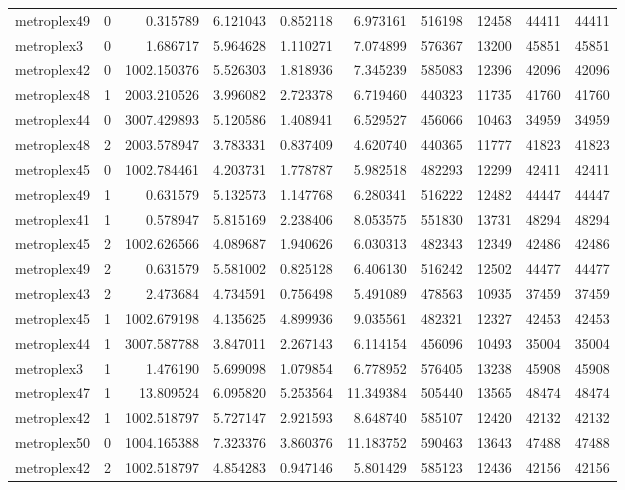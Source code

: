 \begin{longtable}{|l|r|r|r|r|r|r|r|r|r|}
metroplex49 & 0 & 0.315789 & 6.121043 & 0.852118 & 6.973161 & 516198 & 12458 & 44411 & 44411 \\
metroplex3 & 0 & 1.686717 & 5.964628 & 1.110271 & 7.074899 & 576367 & 13200 & 45851 & 45851 \\
metroplex42 & 0 & 1002.150376 & 5.526303 & 1.818936 & 7.345239 & 585083 & 12396 & 42096 & 42096 \\
metroplex48 & 1 & 2003.210526 & 3.996082 & 2.723378 & 6.719460 & 440323 & 11735 & 41760 & 41760 \\
metroplex44 & 0 & 3007.429893 & 5.120586 & 1.408941 & 6.529527 & 456066 & 10463 & 34959 & 34959 \\
metroplex48 & 2 & 2003.578947 & 3.783331 & 0.837409 & 4.620740 & 440365 & 11777 & 41823 & 41823 \\
metroplex45 & 0 & 1002.784461 & 4.203731 & 1.778787 & 5.982518 & 482293 & 12299 & 42411 & 42411 \\
metroplex49 & 1 & 0.631579 & 5.132573 & 1.147768 & 6.280341 & 516222 & 12482 & 44447 & 44447 \\
metroplex41 & 1 & 0.578947 & 5.815169 & 2.238406 & 8.053575 & 551830 & 13731 & 48294 & 48294 \\
metroplex45 & 2 & 1002.626566 & 4.089687 & 1.940626 & 6.030313 & 482343 & 12349 & 42486 & 42486 \\
metroplex49 & 2 & 0.631579 & 5.581002 & 0.825128 & 6.406130 & 516242 & 12502 & 44477 & 44477 \\
metroplex43 & 2 & 2.473684 & 4.734591 & 0.756498 & 5.491089 & 478563 & 10935 & 37459 & 37459 \\
metroplex45 & 1 & 1002.679198 & 4.135625 & 4.899936 & 9.035561 & 482321 & 12327 & 42453 & 42453 \\
metroplex44 & 1 & 3007.587788 & 3.847011 & 2.267143 & 6.114154 & 456096 & 10493 & 35004 & 35004 \\
metroplex3 & 1 & 1.476190 & 5.699098 & 1.079854 & 6.778952 & 576405 & 13238 & 45908 & 45908 \\
metroplex47 & 1 & 13.809524 & 6.095820 & 5.253564 & 11.349384 & 505440 & 13565 & 48474 & 48474 \\
metroplex42 & 1 & 1002.518797 & 5.727147 & 2.921593 & 8.648740 & 585107 & 12420 & 42132 & 42132 \\
metroplex50 & 0 & 1004.165388 & 7.323376 & 3.860376 & 11.183752 & 590463 & 13643 & 47488 & 47488 \\
metroplex42 & 2 & 1002.518797 & 4.854283 & 0.947146 & 5.801429 & 585123 & 12436 & 42156 & 42156 \\

\end{longtable}
